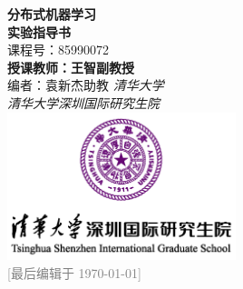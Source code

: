 \thispagestyle{empty}
\begin{titlepage}
    \begin{center}
        \vspace*{0pt}
        \makeatletter    
        \Large{\textbf{分布式机器学习}\\}
        \vspace{1ex}
        \Huge{\textbf{实验指导书}\\}
        \vspace{1ex}
        \small{课程号：85990072\\}
        \large
        \vspace{5ex}
        \textbf{授课教师：王智副教授}\\
        \vspace{.5ex}
        编者：袁新杰助教
        \vfill
        \large\textit{清华大学}\\
        \large\textit{清华大学深圳国际研究生院}\\
        \vspace{3ex}
        \includegraphics[width=0.5\textwidth]{figures/tsinghua-icon.png}\\
        \vspace{2ex}
        \large
        \vspace{.5ex}
        \footnotesize \textcolor{gray}{[最后编辑于 \today]}
        \makeatother
    \end{center}
\end{titlepage}